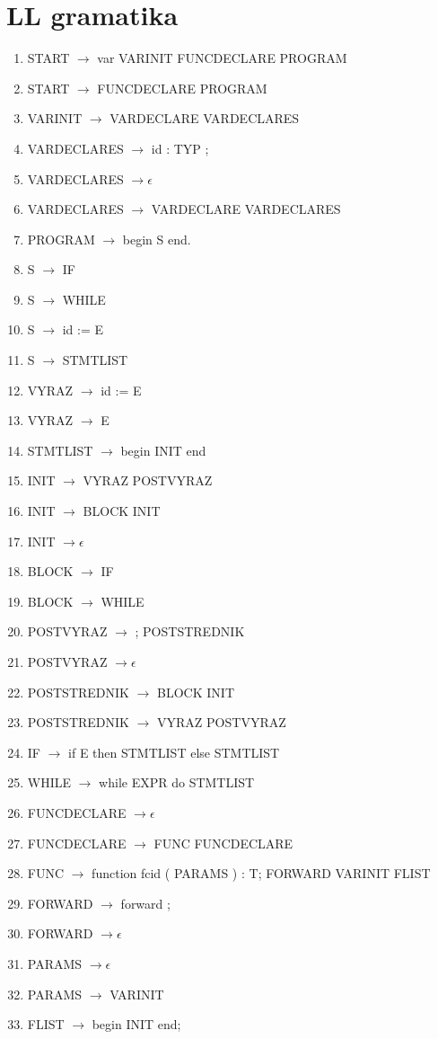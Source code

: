 \documentclass[a4paper]{article}
\begin{document}
\section{LL gramatika}
\begin{enumerate}
\item{START $\rightarrow $ var VARINIT FUNCDECLARE PROGRAM}
\item{START $\rightarrow $ FUNCDECLARE PROGRAM}
\item{VARINIT $\rightarrow $ VARDECLARE VARDECLARES } 
\item{VARDECLARES $\rightarrow $ id : TYP ; } 
\item{VARDECLARES $\rightarrow \epsilon$ } 
\item{VARDECLARES $\rightarrow$ VARDECLARE VARDECLARES } 
\item{PROGRAM $\rightarrow$ begin S end. } 
\item{S $\rightarrow$ IF } 
\item{S $\rightarrow$ WHILE } 
\item{S $\rightarrow$ id := E } 
\item{S $\rightarrow$ STMTLIST } 
\item{VYRAZ $\rightarrow$ id := E } 
\item{VYRAZ $\rightarrow$ E } 
\item{STMTLIST $\rightarrow$ begin INIT end } 
\item{INIT $\rightarrow$ VYRAZ POSTVYRAZ } 
\item{INIT $\rightarrow$ BLOCK INIT } 
\item{INIT $\rightarrow \epsilon$ } 
\item{BLOCK $\rightarrow$ IF } 
\item{BLOCK $\rightarrow$ WHILE }  
\item{POSTVYRAZ $\rightarrow$ ; POSTSTREDNIK } 
\item{POSTVYRAZ $\rightarrow \epsilon$  } 
\item{POSTSTREDNIK $\rightarrow$ BLOCK INIT } 
\item{POSTSTREDNIK $\rightarrow$ VYRAZ POSTVYRAZ } 
\item{IF $\rightarrow$ if E then STMTLIST else STMTLIST } 
\item{WHILE $\rightarrow$ while EXPR do STMTLIST } 
\item{FUNCDECLARE $\rightarrow \epsilon$ } 
\item{FUNCDECLARE $\rightarrow$ FUNC FUNCDECLARE } 
\item{FUNC $\rightarrow$ function fcid ( PARAMS ) : T; FORWARD VARINIT FLIST } 
\item{FORWARD $\rightarrow$ forward ; } 
\item{FORWARD $\rightarrow \epsilon$ } 
\item{PARAMS $\rightarrow \epsilon$ } 
\item{PARAMS $\rightarrow$ VARINIT } 
\item{FLIST $\rightarrow$ begin INIT end; }
\end{enumerate}
\end{document}
